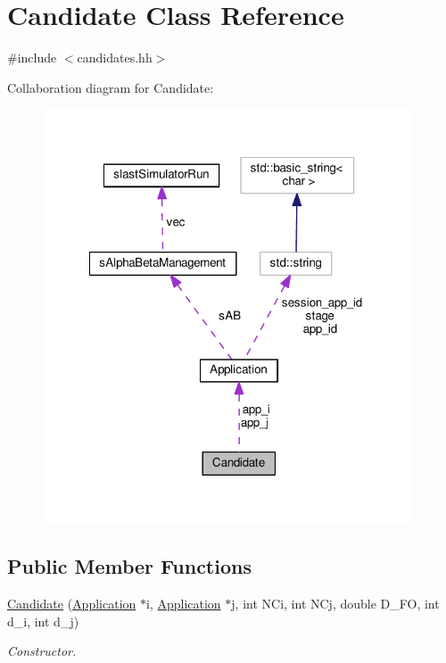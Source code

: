 \hypertarget{classCandidate}{\section{Candidate Class Reference}
\label{classCandidate}
}


{\ttfamily \#include $<$candidates.\-hh$>$}



Collaboration diagram for Candidate\-:\nopagebreak
\begin{figure}[H]
\begin{center}
\leavevmode
\includegraphics[width=309pt]{classCandidate__coll__graph}
\end{center}
\end{figure}
\subsection*{Public Member Functions}
\begin{DoxyCompactItemize}
\item 
\hyperlink{classCandidate_a2d1453a6b8c1a39561e67a2c67b79ed1}{Candidate} (\hyperlink{classApplication}{Application} $\ast$i, \hyperlink{classApplication}{Application} $\ast$j, int N\-Ci, int N\-Cj, double D\-\_\-\-F\-O, int d\-\_\-i, int d\-\_\-j)
\begin{DoxyCompactList}\small\item\em Constructor. \end{DoxyCompactList}\end{DoxyCompactItemize}
